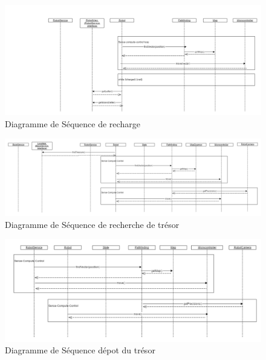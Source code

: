 \begin{figure}
  \centering
  \includegraphics[scale=0.5, angle=90]{resources/diagrams/rechargeState.png}
  \caption{Diagramme de Séquence de recharge}
\end{figure}

\begin{figure}
  \centering
  \includegraphics[scale=0.4, angle=90]{resources/diagrams/findTreasureState.png}
  \caption{Diagramme de Séquence de recherche de trésor}
\end{figure}

\begin{figure}
  \centering
  \includegraphics[scale=0.5, angle=90]{resources/diagrams/depositState.png}
  \caption{Diagramme de Séquence dépot du trésor}
\end{figure}
